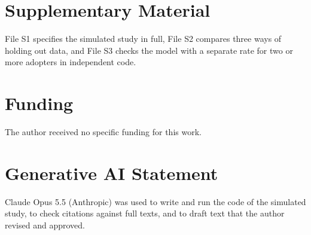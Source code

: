 \documentclass[utf8]{FrontiersinHarvard}
\begin{document}
\section*{Supplementary Material}
File S1 specifies the simulated study in full, File S2 compares three ways of holding out data, and File S3 checks the model with a separate rate for two or more adopters in independent code.

\section*{Funding}
The author received no specific funding for this work.

\section*{Generative AI Statement}
Claude Opus 5.5 (Anthropic) was used to write and run the code of the simulated study, to check citations against full texts, and to draft text that the author revised and approved.



\end{document}
